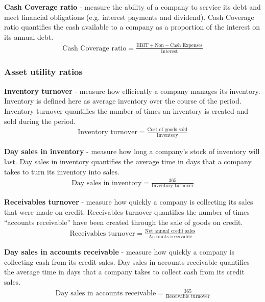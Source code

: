 \textbf{Cash Coverage ratio} - measure the ability of a company to service its debt and meet financial obligations (e.g. interest payments and dividend). Cash Coverage ratio quantifies the cash available to a company as a proportion of the interest on its annual debt.
\begin{gather}
    \textrm{Cash Coverage ratio} = \frac{\textrm{EBIT} + \textrm{Non}-\textrm{Cash Expenses}}{\textrm{Interest}}
\end{gather}
\subsubsection{Asset utility ratios}
\textbf{Inventory turnover} - measure how efficiently a company manages its inventory. Inventory is defined here as average inventory over the course of the period. Inventory turnover quantifies the number of times an inventory is created and sold during the period.
\begin{gather}
    \textrm{Inventory turnover} = \frac{\textrm{Cost of goods sold}}{\textrm{Inventory}}
\end{gather}

\textbf{Day sales in inventory} - measure how long a company's stock of inventory will last. Day sales in inventory quantifies the average time in days that a company takes to turn its inventory into sales.
\begin{gather}
    \textrm{Day sales in inventory} = \frac{365}{\textrm{Inventory turnover}}
\end{gather}

\textbf{Receivables turnover} - measure how quickly a company is collecting its sales that were made on credit. Receivables turnover quantifies the number of times ``accounts receivable'' have been created through the sale of goods on credit.
\begin{gather}
    \textrm{Receivables turnover} = \frac{\textrm{Net annual credit sales}}{\textrm{Accounts receivable}}
\end{gather}

\textbf{Day sales in accounts receivable} - measure how quickly a company is collecting cash from its credit sales. Day sales in accounts receivable quantifies the average time in days that a company takes to collect cash from its credit sales.
\begin{gather}
    \textrm{Day sales in accounts receivable} = \frac{365}{\textrm{Receivable turnover}}
\end{gather}

